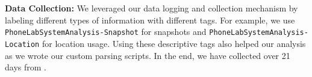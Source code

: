 {\bf Data Collection:} We leveraged our data logging and collection mechanism by
labeling different types of information with different tags. For example,
we use \texttt{PhoneLabSystemAnalysis-Snapshot} for snapshots and
\texttt{PhoneLabSystemAnalysis-Location} for location usage. Using these
descriptive tags also helped our analysis as we wrote our custom parsing
scripts. In the end, we have collected  over 21 days from .
